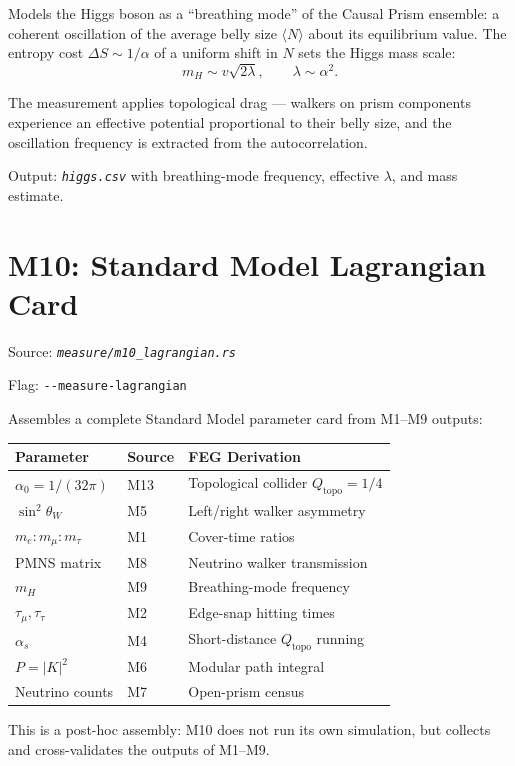 \documentclass[11pt, a4paper, openany]{book}
\newcommand{\flag}[1]{\texttt{-{}-#1}}
\newcommand{\file}[1]{\texttt{\itshape #1}}
\begin{document}
Models the Higgs boson as a ``breathing mode'' of the Causal Prism ensemble:
a coherent oscillation of the average belly size $\langle N \rangle$ about its
equilibrium value.  The entropy cost $\Delta S \sim 1/\alpha$ of a uniform shift
in $N$ sets the Higgs mass scale:
\[
  m_H \sim v \sqrt{2\lambda}, \qquad \lambda \sim \alpha^2.
\]

The measurement applies topological drag --- walkers on prism components experience
an effective potential proportional to their belly size, and the oscillation
frequency is extracted from the autocorrelation.

Output: \file{higgs.csv} with breathing-mode frequency, effective $\lambda$,
and mass estimate.

\section{M10: Standard Model Lagrangian Card}

Source: \file{measure/m10\_lagrangian.rs}

Flag: \flag{measure-lagrangian}

Assembles a complete Standard Model parameter card from M1--M9 outputs:

\begin{longtable}{lll}
  \toprule
  \textbf{Parameter} & \textbf{Source} & \textbf{FEG Derivation} \\
  \midrule
  $\alpha_0 = 1/(32\pi)$ & M13 & Topological collider $Q_{\text{topo}} = 1/4$ \\
  $\sin^2\theta_W$     & M5 & Left/right walker asymmetry \\
  $m_e : m_\mu : m_\tau$ & M1 & Cover-time ratios \\
  PMNS matrix           & M8 & Neutrino walker transmission \\
  $m_H$                 & M9 & Breathing-mode frequency \\
  $\tau_\mu, \tau_\tau$  & M2 & Edge-snap hitting times \\
  $\alpha_s$            & M4 & Short-distance $Q_{\text{topo}}$ running \\
  $P = |K|^2$           & M6 & Modular path integral \\
  Neutrino counts       & M7 & Open-prism census \\
  \bottomrule
\end{longtable}

This is a post-hoc assembly: M10 does not run its own simulation, but collects
and cross-validates the outputs of M1--M9.
\end{document}
